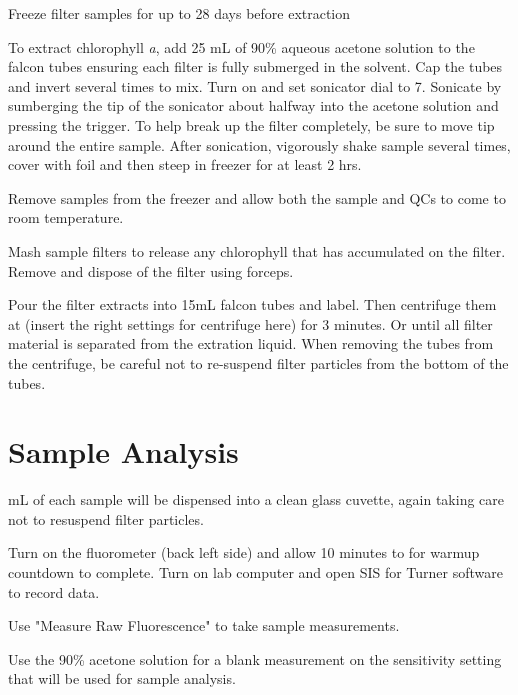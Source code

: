 \documentclass[12pt]{../SOP2}
\begin{document}
\NP Freeze filter samples for up to 28 days before extraction

\NP To extract chlorophyll \textit{a}, add 25 mL of 90\% aqueous acetone solution to the falcon tubes ensuring each filter is fully submerged in the solvent. Cap the tubes and invert several times to mix. Turn on and set sonicator dial to 7. Sonicate by sumberging the tip of the sonicator about halfway into the acetone solution and pressing the trigger. To help break up the filter completely, be sure to move tip around the entire sample. After sonication, vigorously shake sample several times, cover with foil and then steep in freezer for at least 2 hrs.

\NP Remove samples from the freezer and allow both the sample and QCs to come to room temperature. 

\NP Mash sample filters to release any chlorophyll that has accumulated on the filter. Remove and dispose of the filter using forceps.

\NP Pour the filter extracts into 15mL falcon tubes and label. Then centrifuge them at (insert the right settings for centrifuge here) for 3 minutes. Or until all filter material is separated from the extration liquid. When removing the tubes from the centrifuge, be careful not to re-suspend filter particles from the bottom of the tubes.


\section{Sample Analysis}

 mL of each sample will be dispensed into a clean glass cuvette, again taking care not to resuspend filter particles.

\NP Turn on the fluorometer (back left side) and allow 10 minutes to for warmup countdown to complete. Turn on lab computer and open SIS for Turner software to record data. 

\NP Use "Measure Raw Fluorescence" to take sample measurements.

\NP Use the 90\% acetone solution for a blank measurement on the sensitivity setting that will be used for sample analysis. %
\end{document}
